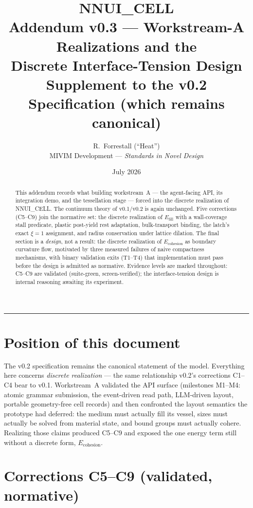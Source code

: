 \documentclass[11pt]{article}
\title{\vspace{-2em}\textbf{NNUI\_CELL}\\[0.3em]
\large Addendum v0.3 --- Workstream-A Realizations and the\\
\large Discrete Interface-Tension Design\\[0.6em]
\normalsize Supplement to the v0.2 Specification (which remains canonical)}
\author{R.~Forrestall (``Heat'')\\ \normalsize MIVIM Development --- \textit{Standards in Novel Design}}
\date{July 2026}
\begin{document}
\maketitle

\begin{abstract}
\noindent
This addendum records what building workstream~A --- the agent-facing API, its
integration demo, and the tessellation stage --- forced into the discrete
realization of NNUI\_CELL. The continuum theory of v0.1/v0.2 is again
unchanged. Five corrections (C5--C9) join the normative set: the discrete
realization of $E_{\text{fill}}$ with a wall-coverage stall predicate, plastic
post-yield rest adaptation, bulk-transport binding, the latch's exact
$\xi{=}1$ assignment, and radius conservation under lattice dilation. The
final section is a \emph{design}, not a result: the discrete realization of
$E_{\text{cohesion}}$ as boundary curvature flow, motivated by three measured
failures of naive compactness mechanisms, with binary validation exits (T1--T4)
that implementation must pass before the design is admitted as normative.
Evidence levels are marked throughout: C5--C9 are validated
(suite-green, screen-verified); the interface-tension design is internal
reasoning awaiting its experiment.
\end{abstract}

\noindent\textcolor{rule}{\rule{\linewidth}{0.8pt}}

\section{Position of this document}

The v0.2 specification remains the canonical statement of the model. Everything
here concerns \emph{discrete realization} --- the same relationship v0.2's
corrections C1--C4 bear to v0.1. Workstream~A validated the API surface
(milestones M1--M4: atomic grammar submission, the event-driven read path,
LLM-driven layout, portable geometry-free cell records) and then confronted the
layout semantics the prototype had deferred: the medium must actually fill its
vessel, sizes must actually be solved from material state, and bound groups
must actually cohere. Realizing those claims produced C5--C9 and exposed the
one energy term still without a discrete form, $E_{\text{cohesion}}$.

\section{Corrections C5--C9 (validated, normative)}
\end{document}
